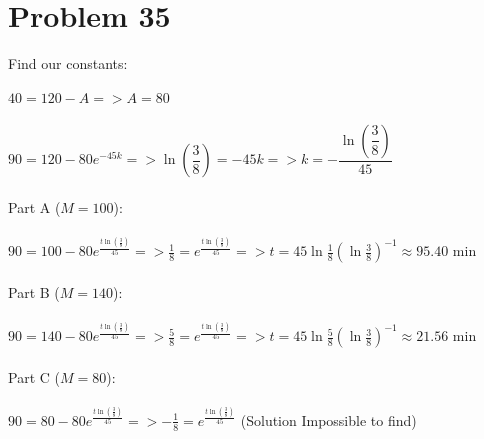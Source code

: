 \documentclass[12pt]{exam}
\begin{document}
\section*{Problem 35}
Find our constants:\\\\
$40=120-A=>A=80$\\\\
$90=120-80e^{-45k}=>\ln{\left(\dfrac{3}{8}\right)}=-45k=>k=-\dfrac{\ln{\left(\dfrac{3}{8}\right)}}{45}$\\\\
Part A ($M=100$):\\\\
$90=100-80e^{\frac{t\ln{\left(\frac{3}{8}\right)}}{45}}=>\frac{1}{8}=e^{\frac{t\ln{\left(\frac{3}{8}\right)}}{45}}=>t=45\ln{\frac{1}{8}}(\ln{\frac{3}{8}})^{-1}\approx95.40$ min\\\\
Part B ($M=140$):\\\\
$90=140-80e^{\frac{t\ln{\left(\frac{3}{8}\right)}}{45}}=>\frac{5}{8}=e^{\frac{t\ln{\left(\frac{3}{8}\right)}}{45}}=>t=45\ln{\frac{5}{8}}(\ln{\frac{3}{8}})^{-1}\approx21.56$ min\\\\
Part C ($M=80$):\\\\
$90=80-80e^{\frac{t\ln{\left(\frac{3}{8}\right)}}{45}}=>-\frac{1}{8}=e^{\frac{t\ln{\left(\frac{3}{8}\right)}}{45}}$ (Solution Impossible to find)
\end{document}

